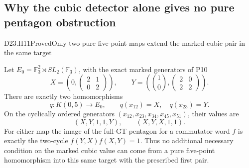 \subsection{Why the cubic detector alone gives no pure pentagon obstruction}

\begin{statement}{D23.H11}{Proved}{Only two pure five-point maps extend the marked cubic pair in the same target}
\end{statement}
Let $E_0=\mathbb F_3^2\rtimes SL_2(\mathbb F_3)$, with
the exact marked generators of P10
\[
 X=\left(0,\begin{pmatrix}2&1\\0&2\end{pmatrix}\right),
 \qquad
 Y=\left(\binom10,\begin{pmatrix}2&0\\2&2\end{pmatrix}\right).
\]
There are exactly two homomorphisms
\[
 q:K(0,5)\longrightarrow E_0,
 \qquad q(x_{12})=X,\quad q(x_{23})=Y.
\]
On the cyclically ordered generators
$(x_{12},x_{23},x_{34},x_{45},x_{51})$, their values are
\[
                    (X,Y,1,1,Y),\qquad (X,Y,X,1,1).
                                                        \tag{D23.H11.1}
\]
For either map the image of the full-GT pentagon for a
commutator word $f$ is exactly the two-cycle
$f(Y,X)f(X,Y)=1$. Thus no additional necessary condition
on the marked cubic value can come from a pure five-point
homomorphism into this same target with the prescribed
first pair.

